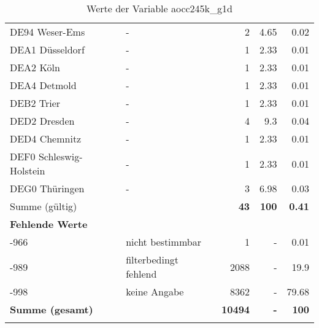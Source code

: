 \begin{longtable}{Xlrrr}
        \multicolumn{1}{X}{DE94 Weser-Ems} & - & \num{2} & \num[round-mode=places,round-precision=2]{4.65} & \num[round-mode=places,round-precision=2]{0.02} \\
        \multicolumn{1}{X}{DEA1 Düsseldorf} & - & \num{1} & \num[round-mode=places,round-precision=2]{2.33} & \num[round-mode=places,round-precision=2]{0.01} \\
        \multicolumn{1}{X}{DEA2 Köln} & - & \num{1} & \num[round-mode=places,round-precision=2]{2.33} & \num[round-mode=places,round-precision=2]{0.01} \\
        \multicolumn{1}{X}{DEA4 Detmold} & - & \num{1} & \num[round-mode=places,round-precision=2]{2.33} & \num[round-mode=places,round-precision=2]{0.01} \\
        \multicolumn{1}{X}{DEB2 Trier} & - & \num{1} & \num[round-mode=places,round-precision=2]{2.33} & \num[round-mode=places,round-precision=2]{0.01} \\
        \multicolumn{1}{X}{DED2 Dresden} & - & \num{4} & \num[round-mode=places,round-precision=2]{9.3} & \num[round-mode=places,round-precision=2]{0.04} \\
        \multicolumn{1}{X}{DED4 Chemnitz} & - & \num{1} & \num[round-mode=places,round-precision=2]{2.33} & \num[round-mode=places,round-precision=2]{0.01} \\
        \multicolumn{1}{X}{DEF0 Schleswig-Holstein} & - & \num{1} & \num[round-mode=places,round-precision=2]{2.33} & \num[round-mode=places,round-precision=2]{0.01} \\
        \multicolumn{1}{X}{DEG0 Thüringen} & - & \num{3} & \num[round-mode=places,round-precision=2]{6.98} & \num[round-mode=places,round-precision=2]{0.03} \\
     \midrule
      \multicolumn{2}{l}{Summe (gültig)} & \textbf{\num{43}} &
      \textbf{\num{100}} &
         \textbf{\num[round-mode=places,round-precision=2]{0.41}} \\
     \multicolumn{5}{l}{\textbf{Fehlende Werte}}\\
       -966 & nicht bestimmbar & \num{1} & - & \num[round-mode=places,round-precision=2]{0.01} \\

       -989 & filterbedingt fehlend & \num{2088} & - & \num[round-mode=places,round-precision=2]{19.9} \\

       -998 & keine Angabe & \num{8362} & - & \num[round-mode=places,round-precision=2]{79.68} \\

     \midrule
     \multicolumn{2}{l}{\textbf{Summe (gesamt)}} & \textbf{\num{10494}} & \textbf{-} & \textbf{\num{100}} \\
     \bottomrule
     \caption{Werte der Variable aocc245k\_g1d}
     \end{longtable}
     
